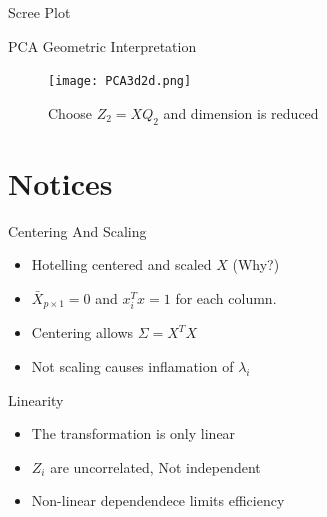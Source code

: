 \documentclass{beamer}
\begin{document}
\begin{frame}{Scree Plot}
    \begin{center}
    \end{center}
\end{frame}

\begin{frame}{PCA Geometric Interpretation}
    \begin{figure}
        \texttt{[image: PCA3d2d.png]}
        \caption{Choose \(Z_2 = X Q_2\) and dimension is reduced}
    \end{figure}
\end{frame}

\section{Notices}
\begin{frame}{Centering And Scaling}
    \begin{itemize}
        \item Hotelling centered and scaled \(X\) (Why?)
        \item \(\bar{X}_{p\times 1} = 0\) and \(x_i^Tx = 1\) for each column.
        \item Centering allows \(\Sigma = X^TX\)
        \item Not scaling causes inflamation of \(\lambda_i\)
    \end{itemize}
\end{frame}

\begin{frame}{Linearity}
    \begin{itemize}
        \item The transformation is only linear
        \item \(Z_i\) are uncorrelated, Not independent
        \item Non-linear dependendece limits efficiency
    \end{itemize}
\end{frame}
\end{document}
